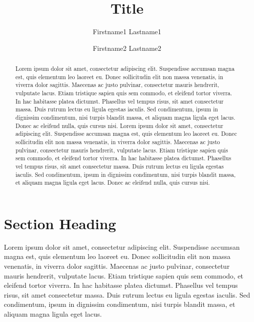 \documentclass{Format_page}
\begin{document}
\title{Title}

\author{Firstname1 Lastname1}
\author{Firstname2 Lastname2}

\date{}

\maketitle

\begin{abstract}
Lorem ipsum dolor sit amet, consectetur adipiscing elit. Suspendisse accumsan magna est, quis elementum leo laoreet eu. Donec sollicitudin elit non massa venenatis, in viverra dolor sagittis. Maecenas ac justo pulvinar, consectetur mauris hendrerit, vulputate lacus. Etiam tristique sapien quis sem commodo, et eleifend tortor viverra. In hac habitasse platea dictumst. Phasellus vel tempus risus, sit amet consectetur massa. Duis rutrum lectus eu ligula egestas iaculis. Sed condimentum, ipsum in dignissim condimentum, nisi turpis blandit massa, et aliquam magna ligula eget lacus. Donec ac eleifend nulla, quis cursus nisi. Lorem ipsum dolor sit amet, consectetur adipiscing elit. Suspendisse accumsan magna est, quis elementum leo laoreet eu. Donec sollicitudin elit non massa venenatis, in viverra dolor sagittis. Maecenas ac justo pulvinar, consectetur mauris hendrerit, vulputate lacus. Etiam tristique sapien quis sem commodo, et eleifend tortor viverra. In hac habitasse platea dictumst. Phasellus vel tempus risus, sit amet consectetur massa. Duis rutrum lectus eu ligula egestas iaculis. Sed condimentum, ipsum in dignissim condimentum, nisi turpis blandit massa, et aliquam magna ligula eget lacus. Donec ac eleifend nulla, quis cursus nisi.
\end{abstract}

\section{Section Heading}

Lorem ipsum dolor sit amet, consectetur adipiscing elit. Suspendisse accumsan magna est, quis elementum leo laoreet eu. Donec sollicitudin elit non massa venenatis, in viverra dolor sagittis. Maecenas ac justo pulvinar, consectetur mauris hendrerit, vulputate lacus. Etiam tristique sapien quis sem commodo, et eleifend tortor viverra. In hac habitasse platea dictumst. Phasellus vel tempus risus, sit amet consectetur massa. Duis rutrum lectus eu ligula egestas iaculis. Sed condimentum, ipsum in dignissim condimentum, nisi turpis blandit massa, et aliquam magna ligula eget lacus.
\end{document}
